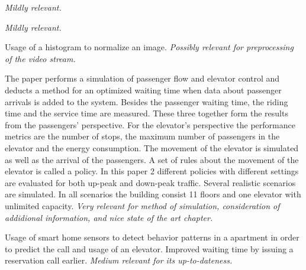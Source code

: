 


\emph{Mildly relevant.}

\emph{Mildly relevant.}





Usage of a histogram to normalize an image.
\emph{Possibly relevant for preprocessing of the video stream.}






The paper performs a simulation of passenger flow and elevator control 
and deducts a method for an optimized waiting time when data about passenger 
arrivals is added to the system.
Besides the passenger waiting time, the riding time and the service time are measured. These
three together form the results from the passengers’ perspective. For the elevator’s
perspective the performance metrics are the number of stops, the maximum number of
passengers in the elevator and the energy consumption. The movement of the elevator is
simulated as well as the arrival of the passengers. A set of rules about the movement of the
elevator is called a policy. In this paper 2 different policies with different settings are evaluated
for both up-peak and down-peak traffic. Several realistic scenarios are simulated. In all
scenarios the building consist 11 floors and one elevator with unlimited capacity.
\emph{Very relevant for method of simulation, consideration of addidional information, and nice state of the art chapter.}

Usage of smart home sensors to detect behavior patterns in a apartment in order to predict the call and usage of an elevator. Improved waiting time by issuing a reservation call earlier.
\emph{Medium relevant for its up-to-dateness.}

